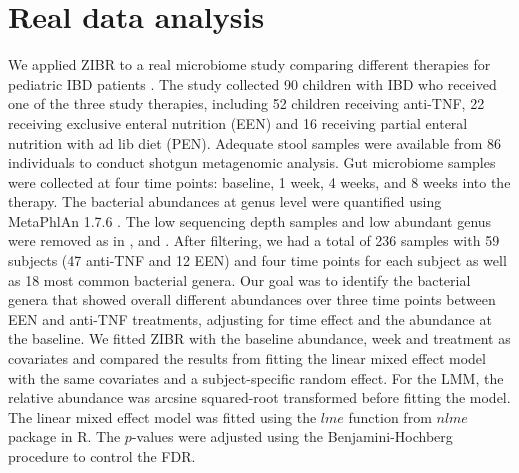 \section{Real data analysis}
We applied ZIBR to a real microbiome study comparing different therapies for pediatric IBD patients \citep{lewis2015inflammation,lee2015comparative}. The study  collected 90 children  with IBD who received one of the three study therapies, including 52 children receiving anti-TNF,
22 receiving exclusive enteral nutrition (EEN) and  16 receiving partial enteral nutrition
with ad lib diet (PEN). Adequate stool samples were available from 86 individuals to
conduct shotgun metagenomic analysis. Gut microbiome samples were
collected at four time points: baseline, 1 week, 4 weeks, and
8 weeks into the therapy.  The bacterial abundances at genus level were  quantified using MetaPhlAn 1.7.6 \citep{segata2012metagenomic}. The low sequencing depth samples and low abundant genus were removed as in \cite{Kostic:2015bh}, \cite{Romero:2014il} and \cite{Stein:2013dl}. After filtering, we had a total of 236 samples with  59 subjects (47 anti-TNF and 12 EEN) and four  time points for each subject as well as 18 most common bacterial genera. Our goal was to identify the bacterial genera that showed overall different abundances over  three time points between  EEN and anti-TNF treatments, adjusting for time effect  and the  abundance at the baseline.  We fitted ZIBR with the baseline abundance, week and treatment as covariates and compared the results  from fitting the linear mixed effect model   \citep{LaRosa:2014kk,Kostic:2015bh} with the same covariates and a subject-specific random effect.   For the LMM, the relative abundance was arcsine squared-root transformed before fitting the model. The linear mixed effect model was fitted using the $lme$ function from $nlme$ package in R. The $p$-values were adjusted using  the Benjamini-Hochberg procedure to control the FDR.  




